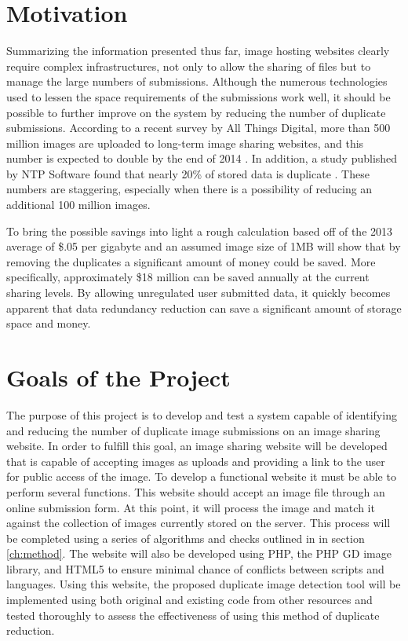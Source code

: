 \section{Motivation} \label{sec:motivation}
Summarizing the information presented thus far, image hosting websites clearly require complex infrastructures, not only to allow the sharing of files but to manage the large numbers of submissions. Although the numerous technologies used to lessen the space requirements of the submissions work well, it should be possible to further improve on the system by reducing the number of duplicate submissions. According to a recent survey by All Things Digital, more than 500 million images are uploaded to long-term image sharing websites, and this number is expected to double by the end of 2014 \cite{meek:500}. In addition, a study published by NTP Software found that nearly 20\% of stored data is duplicate \cite{ntps:staledata}. These numbers are staggering, especially when there is a possibility of reducing an additional 100 million images.

To bring the possible savings into light a rough calculation based off of the 2013 average of \$.05 per gigabyte and an assumed image size of 1MB will show that by removing the duplicates a significant amount of money could be saved. More specifically, approximately \$18 million can be saved annually at the current sharing levels. By allowing unregulated user submitted data, it quickly becomes apparent that data redundancy reduction can save a significant amount of storage space and money.

\section{Goals of the Project}\label{sec:goals}
The purpose of this project is to develop and test a system capable of identifying and reducing the number of duplicate image submissions on an image sharing website. In order to fulfill this goal, an image sharing website will be developed that is capable of accepting images as uploads and providing a link to the user for public access of the image. To develop a functional website it must be able to perform several functions. This website should accept an image file through an online submission form. At this point, it will process the image and match it against the collection of images currently stored on the server. This process will be completed using a series of algorithms and checks outlined in in section \ref{ch:method}. The website will also be developed using PHP, the PHP GD image library, and HTML5 to ensure minimal chance of conflicts between scripts and languages. Using this website, the proposed duplicate image detection tool will be implemented using both original and existing code from other resources and tested thoroughly to assess the effectiveness of using this method of duplicate reduction.

